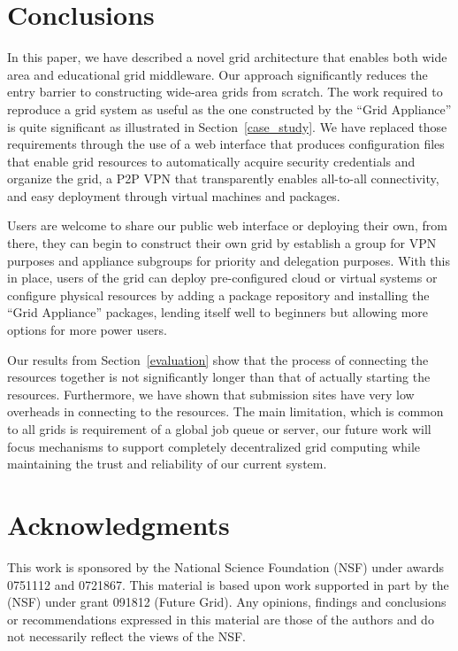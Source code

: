 \documentclass[conference]{IEEEtran}
\begin{document}
\section{Conclusions}
\label{conclusions}

In this paper, we have described a novel grid architecture that enables both
wide area and educational grid middleware.  Our approach significantly reduces
the entry barrier to constructing wide-area grids from scratch.  The work
required to reproduce a grid system as useful as the one constructed by the
``Grid Appliance'' is quite significant as illustrated in
Section~\ref{case_study}.  We have replaced those requirements through the use
of a web interface that produces configuration files that enable grid resources
to automatically acquire security credentials and organize the grid, a P2P VPN
that transparently enables all-to-all connectivity, and easy deployment through
virtual machines and packages.

Users are welcome to share our public web interface or deploying their own,
from there, they can begin to construct their own grid by establish a group for
VPN purposes and appliance subgroups for priority and delegation purposes.
With this in place, users of the grid can deploy pre-configured cloud or
virtual systems or configure physical resources by adding a package repository
and installing the ``Grid Appliance'' packages, lending itself well to
beginners but allowing more options for more power users.

Our results from Section~\ref{evaluation} show that the process of connecting
the resources together is not significantly longer than that of actually
starting the resources.  Furthermore, we have shown that submission sites have
very low overheads in connecting to the resources.  The main limitation, which
is common to all grids is requirement of a global job queue or server, our
future work will focus mechanisms to support completely decentralized grid
computing while maintaining the trust and reliability of our current system.

\section*{Acknowledgments}

This work is sponsored by the National Science Foundation (NSF) under awards
0751112 and 0721867.  This material is based upon work supported in part by the
(NSF) under grant 091812 (Future Grid).  Any opinions, findings and conclusions
or recommendations expressed in this material are those of the authors and do
not necessarily reflect the views of the NSF.



\end{document}
